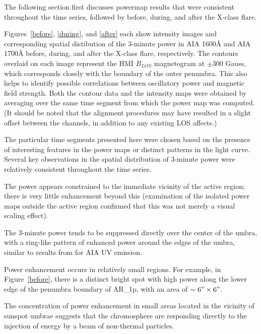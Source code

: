 
The following section first discusses powermap results that were
consistent throughout the time series, followed by before, during, and after the
X-class flare.



Figures~\ref{before}, \ref{during}, and \ref{after}
each show intensity images and corresponding
spatial distibution of the 3-minute power
in AIA 1600\AA{} and AIA 1700\AA{}
before, during, and after the X-class flare, respectively.
The contours overlaid on each image represent the
HMI $B_{LOS}$ magnetogram at $\pm$300 Gauss,
which corresponds
closely with the boundary of the outer penumbra.
This also helps to identify possible correlations between
oscillatory power and magnetic field strength.
Both the contour data and the intensity maps were
obtained by averaging over the same time segment 
from which the power map was computed.
(It should be noted that the alignment procedures may have resulted in a slight
offset between the channels, in addition to any existing LOS affects.)

The particular time segments presented here
were chosen based on the presence of interesting features
in the power maps
or distinct patterns in the light curve.
Several key observations in the spatial distribution of
3-minute power
were relatively consistent throughout the time series.


The power appears constrained to the immediate vicinity of the
active region; there is very little enhancement beyond this
(examination of the isolated power maps outside the active region
confirmed that this was not merely a visual scaling effect).


The 3-minute power tends to be suppressed directly over the center of the umbra,
with a ring-like pattern of enhanced power around the edges of the umbra,
similar to results from \cite{Reznikova2012} for AIA UV emission.

Power enhancement occurs in relatively small regions.
For example, in Figure~\ref{before}, there is a distinct bright spot
with high power along the lower edge of the penumbra boundary
of AR\_1p, with an area of $\sim6"\times6"$.

The concentration of power enhancement in small areas
located in the vicinity of sunspot umbrae suggests that
 the chromosphere
are responding directly to the injection of energy by
a beam of non-thermal particles.


